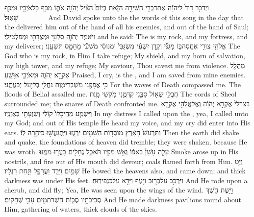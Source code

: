 {וַיְדַבֵּ֤ר דָּוִד֙ לַיהֹוָ֔ה אֶת\maqqaf דִּבְרֵ֖י הַשִּׁירָ֣ה הַזֹּ֑את בְּיוֹם֩ הִצִּ֨יל יְהֹוָ֥ה אֹת֛וֹ מִכַּ֥ף כׇּל\maqqaf אֹיְבָ֖יו וּמִכַּ֥ף שָׁאֽוּל׃        }
{And David spoke unto the \lord\space the words of this song in the day that the \lord\space delivered him out of the hand of all his enemies, and out of the hand of Saul;}
{וַיֹּאמַ֑ר יְהֹוָ֛ה סַֽלְעִ֥י וּמְצֻדָתִ֖י וּמְפַלְטִי\maqqaf לִֽי׃}
{and he said: The \lord\space is my rock, and my fortress, and my deliverer;}
{אֱלֹהֵ֥י צוּרִ֖י אֶחֱסֶה\maqqaf בּ֑וֹ מָגִנִּ֞י וְקֶ֣רֶן יִשְׁעִ֗י מִשְׂגַּבִּי֙ וּמְנוּסִ֔י מֹשִׁעִ֕י מֵחָמָ֖ס תֹּשִׁעֵֽנִי׃}
{The God who is my rock, in Him I take refuge; My shield, and my horn of salvation, my high tower, and my refuge; My saviour, Thou savest me from violence.}
{מְהֻלָּ֖ל אֶקְרָ֣א יְהֹוָ֑ה וּמֵאֹיְבַ֖י אִוָּשֵֽׁעַ׃}
{Praised, I cry, is the \lord, and I am saved from mine enemies.}
{כִּ֥י אֲפָפֻ֖נִי מִשְׁבְּרֵי\maqqaf מָ֑וֶת נַחֲלֵ֥י בְלִיַּ֖עַל יְבַעֲתֻֽנִי׃}
{For the waves of Death compassed me. The floods of Belial assailed me.}
{חֶבְלֵ֥י שְׁא֖וֹל סַבֻּ֑נִי קִדְּמֻ֖נִי מֹ֥קְשֵׁי מָֽוֶת׃}
{The cords of Sheol surrounded me; the snares of Death confronted me.}
{בַּצַּר\maqqaf לִי֙ אֶקְרָ֣א יְהֹוָ֔ה וְאֶל\maqqaf אֱלֹהַ֖י אֶקְרָ֑א וַיִּשְׁמַ֤ע מֵהֵֽיכָלוֹ֙ קוֹלִ֔י וְשַׁוְעָתִ֖י בְּאׇזְנָֽיו׃}
{In my distress I called upon the \lord, yea, I called unto my God; and out of His temple He heard my voice, and my cry did enter into His ears.}
{ וַתִּרְעַשׁ֙ הָאָ֔רֶץ מוֹסְד֥וֹת הַשָּׁמַ֖יִם יִרְגָּ֑זוּ וַיִּֽתְגָּעֲשׁ֖וּ כִּי\maqqaf חָ֥רָה לֽוֹ׃}
{Then the earth did shake and quake, the foundations of heaven did tremble; they were shaken, because He was wroth.}
{עָלָ֤ה עָשָׁן֙ בְּאַפּ֔וֹ וְאֵ֥שׁ מִפִּ֖יו תֹּאכֵ֑ל גֶּחָלִ֖ים בָּעֲר֥וּ מִמֶּֽנּוּ׃}
{Smoke arose up in His nostrils, and fire out of His mouth did devour; coals flamed forth from Him.}
{וַיֵּ֥ט שָׁמַ֖יִם וַיֵּרַ֑ד וַעֲרָפֶ֖ל תַּ֥חַת רַגְלָֽיו׃}
{He bowed the heavens also, and came down; and thick darkness was under His feet.}
{וַיִּרְכַּ֥ב עַל\maqqaf כְּר֖וּב וַיָּעֹ֑ף וַיֵּרָ֖א עַל\maqqaf כַּנְפֵי\maqqaf רֽוּחַ׃}
{And He rode upon a cherub, and did fly; Yea, He was seen upon the wings of the wind.}
{וַיָּ֥שֶׁת חֹ֛שֶׁךְ סְבִיבֹתָ֖יו סֻכּ֑וֹת חַֽשְׁרַת\maqqaf מַ֖יִם עָבֵ֥י שְׁחָקִֽים׃}
{And He made darkness pavilions round about Him, gathering of waters, thick clouds of the skies.}
